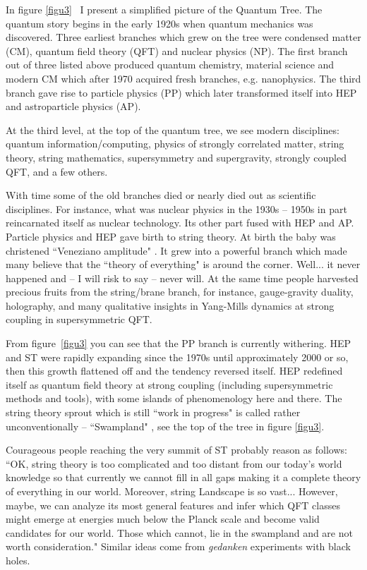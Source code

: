 \documentclass[epsfig,12pt]{article}
\begin{document}
\frenchspacing

In figure \ref{figu3}\ %
I  present  a simplified picture of the Quantum Tree. The quantum story begins in the early 1920s when  quantum mechanics was discovered. Three 
earliest branches which grew on the tree were condensed matter (CM), quantum field theory (QFT) and nuclear physics (NP). The first  branch out of three listed above produced quantum chemistry, material science and modern CM which after 1970 acquired  fresh branches, e.g.  nanophysics. The third branch gave rise to particle physics (PP) which later transformed itself into HEP and astroparticle physics (AP).

At the third level, at the top of the quantum tree, we see modern disciplines: quantum information/computing, physics of strongly correlated matter, string theory, string mathematics, supersymmetry and supergravity, strongly coupled QFT, and a few others. 

 With time some of the old branches died or nearly died out as scientific disciplines. 
For instance, what was nuclear physics in the 1930s -- 1950s in part reincarnated itself as nuclear technology. Its other part fused with HEP and AP.
Particle physics and HEP gave birth to string theory. At birth the baby was christened ``Veneziano amplitude" \cite{va}. It grew into a powerful branch which made many believe  
that the ``theory of everything" is around the corner. Well... it never happened and -- I will risk to say -- never will. At the same time people harvested precious fruits from the string/brane branch, for instance,  gauge-gravity duality, holography, and many qualitative insights in Yang-Mills dynamics at strong coupling in supersymmetric QFT.

From figure~\ref{figu3}  you can see that the PP branch is currently withering. HEP and ST  were rapidly expanding since the 1970s until approximately 2000 or so, then this growth flattened off and the tendency reversed itself. HEP redefined itself as quantum field theory at strong coupling (including supersymmetric methods and tools), with some islands of phenomenology here and there. The string theory sprout which is still ``work in progress"  is called rather unconventionally -- ``Swampland" \cite{swamp, swamp1},  see the top of the tree in figure \ref{figu3}. 

Courageous people reaching the very summit of ST  probably reason as follows: ``OK, string theory is too complicated and too distant from our today's world knowledge so that currently we cannot  fill in all gaps making it a complete theory of everything in our world. Moreover, string Landscape is so vast... However, maybe, we can analyze its most general features and infer which QFT classes might emerge at energies much below the Planck scale and become valid candidates for our world. Those which cannot,  lie in the swampland and are not worth consideration." Similar ideas come from {\em gedanken} experiments with black holes.
\end{document}
